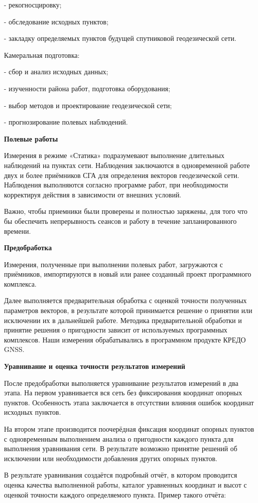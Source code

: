 \documentclass[a4paper]{article}
\begin{document}
{\begin{newpage}
\par - рекогносцировку;
\par - обследование исходных пунктов;
\par - закладку определяемых пунктов будущей спутниковой геодезической сети.
\par Камеральная подготовка:
\par - сбор и анализ исходных данных;
\par - изученности района работ, подготовка оборудования;
\par - выбор методов и проектирование геодезической сети;
\par - прогнозирование полевых наблюдений. 
\begin{center}
    \large {\textbf{Полевые работы}}
\end{center}
\par Измерения в режиме «Статика» подразумевают выполнение длительных наблюдений на пунктах сети. Наблюдения заключаются в одновременной работе двух и более приёмников СГА для определения векторов геодезической сети. Наблюдения выполняются согласно программе работ, при необходимости корректируя действия в зависимости от внешних условий.
\par Важно, чтобы приемники были проверены и полностью заряжены, для того что бы обеспечить непрерывность сеансов и работу в течение запланированного времени.
\begin{center}
    \large {\textbf{Предобработка}}
\end{center}
\par Измерения, полученные при выполнении полевых работ, загружаются с приёмников, импортируются в новый или ранее созданный проект программного комплекса.
\par Далее выполняется предварительная обработка с оценкой точности полученных параметров векторов, в результате которой принимается решение о принятии или исключении их в дальнейшей работе. Методика предварительной обработки и принятие решения о пригодности зависит от используемых программных комплексов. Наши измерения обрабатывались в программном продукте КРЕДО GNSS.
\begin{center}
    \large {\textbf{Уравнивание и оценка точности результатов измерений}}
\end{center}
\par После предобработки выполняется уравнивание результатов измерений в два этапа. На первом уравнивается вся сеть без фиксирования координат опорных пунктов. Особенность этапа заключается в отсутствии влияния ошибок координат исходных пунктов.
\par На втором этапе производится поочерёдная фиксация координат опорных пунктов с одновременным выполнением анализа о пригодности каждого пункта для выполнения уравнивания сети. В результате возможно принятие решений об исключении или необходимости добавления других опорных пунктов.
\par В результате уравнивания создаётся подробный отчёт, в котором проводится оценка качества выполненной работы, каталог уравненных координат и высот с оценкой точности каждого определяемого пункта. Пример такого отчёта:
\end{newpage}
}
\end{document}

